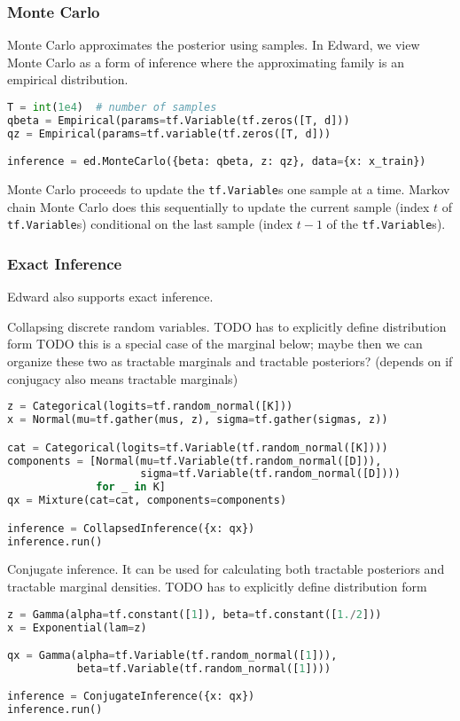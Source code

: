 \subsubsection{Monte Carlo}

Monte Carlo approximates the posterior using samples. In Edward, we view
Monte Carlo as a form of inference where the approximating family is
an empirical distribution.
\begin{lstlisting}[language=Python]
T = int(1e4)  # number of samples
qbeta = Empirical(params=tf.Variable(tf.zeros([T, d]))
qz = Empirical(params=tf.variable(tf.zeros([T, d]))

inference = ed.MonteCarlo({beta: qbeta, z: qz}, data={x: x_train})
\end{lstlisting}
Monte Carlo proceeds to update the \texttt{tf.Variable}s one sample
at a time. Markov chain Monte Carlo does this sequentially to update
the current sample (index $t$ of \texttt{tf.Variable}s) conditional on
the last sample (index $t-1$ of the \texttt{tf.Variable}s).

\subsubsection{Exact Inference}

Edward also supports exact inference.

Collapsing discrete random variables.
TODO has to explicitly define distribution form
TODO this is a special case of the marginal below; maybe then we can organize these two as tractable marginals and tractable posteriors? (depends on if conjugacy also means tractable marginals)
\begin{lstlisting}[language=Python]
z = Categorical(logits=tf.random_normal([K]))
x = Normal(mu=tf.gather(mus, z), sigma=tf.gather(sigmas, z))

cat = Categorical(logits=tf.Variable(tf.random_normal([K])))
components = [Normal(mu=tf.Variable(tf.random_normal([D])),
                     sigma=tf.Variable(tf.random_normal([D])))
              for _ in K]
qx = Mixture(cat=cat, components=components)

inference = CollapsedInference({x: qx})
inference.run()
\end{lstlisting}

Conjugate inference. It can be used for calculating both tractable posteriors and tractable marginal densities.
TODO has to explicitly define distribution form
\begin{lstlisting}[language=Python]
z = Gamma(alpha=tf.constant([1]), beta=tf.constant([1./2]))
x = Exponential(lam=z)

qx = Gamma(alpha=tf.Variable(tf.random_normal([1])),
           beta=tf.Variable(tf.random_normal([1])))

inference = ConjugateInference({x: qx})
inference.run()
\end{lstlisting}

